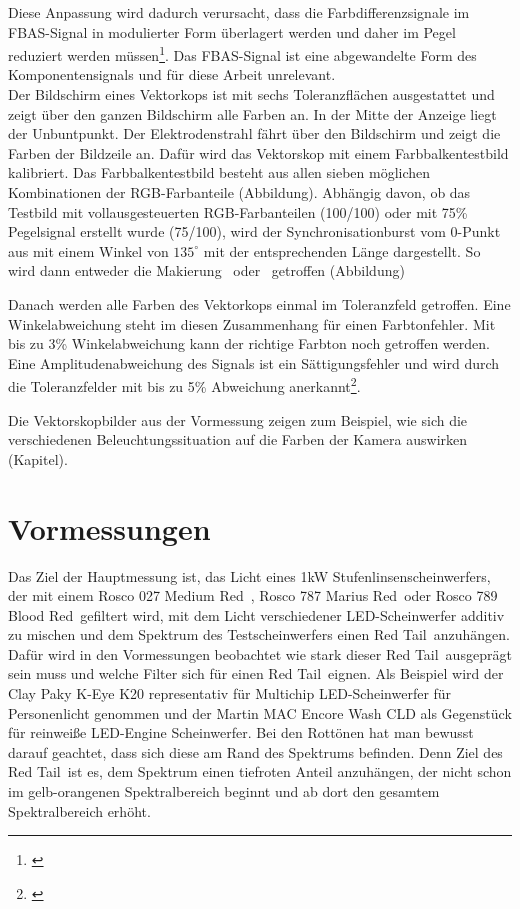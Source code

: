 Diese Anpassung wird dadurch verursacht, dass die Farbdifferenzsignale im FBAS-Signal in modulierter Form überlagert werden und daher im Pegel reduziert werden müssen\footnote{\cite[84]{schmidt}}. Das FBAS-Signal ist eine abgewandelte Form des Komponentensignals und für diese Arbeit unrelevant.\\
Der Bildschirm eines Vektorkops ist mit sechs Toleranzflächen ausgestattet und zeigt über den ganzen Bildschirm alle Farben an. In der Mitte der Anzeige liegt der Unbuntpunkt. Der Elektrodenstrahl fährt über den Bildschirm und zeigt die Farben der Bildzeile an. Dafür wird das Vektorskop mit einem Farbbalkentestbild kalibriert. Das Farbbalkentestbild besteht aus allen sieben möglichen Kombinationen der RGB-Farbanteile (Abbildung).
Abhängig davon, ob das Testbild mit vollausgesteuerten RGB-Farbanteilen (100/100) oder mit 75\% Pegelsignal erstellt wurde (75/100), wird der Synchronisationburst vom 0-Punkt aus mit einem Winkel von $135^\circ$ mit der entsprechenden Länge dargestellt. So wird dann entweder die Makierung \grqq\ oder \grqq\ getroffen (Abbildung)

Danach werden alle Farben des Vektorkops einmal im Toleranzfeld getroffen. Eine Winkelabweichung steht im diesen Zusammenhang für einen Farbtonfehler. Mit bis zu 3\% Winkelabweichung kann der richtige Farbton noch getroffen werden. Eine Amplitudenabweichung des Signals ist ein Sättigungsfehler und wird durch die Toleranzfelder mit bis zu 5\% Abweichung anerkannt\footnote{\cite[114]{schmidt}}.

Die Vektorskopbilder aus der Vormessung zeigen zum Beispiel, wie sich die verschiedenen Beleuchtungssituation auf die Farben der Kamera auswirken (Kapitel).

\chapter{Vormessungen}

Das Ziel der Hauptmessung ist, das Licht eines 1kW Stufenlinsenscheinwerfers, der mit einem Rosco 027 \glqq Medium Red\grqq\ , Rosco 787 \glqq Marius Red\grqq\ oder Rosco 789 \glqq Blood Red\grqq\ gefiltert wird, mit dem Licht verschiedener LED-Scheinwerfer additiv zu mischen und dem Spektrum des Testscheinwerfers einen \glqq Red Tail\grqq\ anzuhängen. 
Dafür wird in den Vormessungen beobachtet wie stark dieser \glqq Red Tail\grqq\ ausgeprägt sein muss und welche Filter sich für einen \glqq Red Tail\grqq\ eignen.   
Als Beispiel wird der Clay Paky K-Eye K20 representativ für Multichip LED-Scheinwerfer für Personenlicht genommen und der Martin MAC Encore Wash CLD als Gegenstück für reinweiße LED-Engine Scheinwerfer. 
Bei den Rottönen hat man bewusst darauf geachtet, dass sich diese am Rand des Spektrums befinden. Denn Ziel des \glqq Red Tail\grqq\ ist es, dem Spektrum einen tiefroten Anteil anzuhängen, der nicht schon im gelb-orangenen Spektralbereich beginnt und ab dort den gesamtem Spektralbereich erhöht.  

